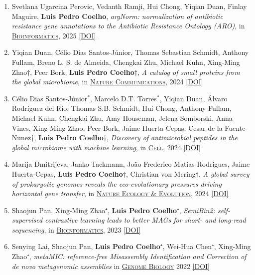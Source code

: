 \documentclass{article}
\newcommand\showdoi[1]{%
    \href{http://dx.doi.org/#1}{[DOI]}%
}
\newcommand\pubname[1]{\textsc{\uline{#1}}}
\newcommand\costar{${}^{*}$}
\newcommand\cosenior{†}
\begin{document}
\begin{enumerate}[resume]

\item Svetlana Ugarcina Perovic, Vedanth Ramji, Hui Chong, Yiqian Duan, Finlay Maguire, \textbf{Luis Pedro Coelho}, \emph{argNorm: normalization of antibiotic resistance gene annotations to the Antibiotic Resistance Ontology (ARO)}, in \pubname{Bioinformatics}, 2025 \showdoi{10.1093/bioinformatics/btaf173}

\item Yiqian Duan, Célio Dias Santos-Júnior, Thomas Sebastian Schmidt, Anthony Fullam, Breno L. S. de Almeida, Chengkai Zhu, Michael Kuhn, Xing-Ming Zhao\cosenior, Peer Bork, \textbf{Luis Pedro Coelho}\cosenior, \emph{A catalog of small proteins from the global microbiome}, in \pubname{Nature Communications}, 2024 \showdoi{10.1038/s41467-024-51894-6}

\item Célio Dias Santos-Júnior\costar, Marcelo D.T. Torres\costar, Yiqian Duan, Álvaro Rodríguez del Río, Thomas S.B. Schmidt, Hui Chong, Anthony Fullam, Michael Kuhn, Chengkai Zhu, Amy Houseman, Jelena Somborski, Anna Vines, Xing-Ming Zhao, Peer Bork, Jaime Huerta-Cepas, Cesar de la Fuente-Nunez\cosenior, \textbf{Luis Pedro Coelho}\cosenior, \emph{Discovery of antimicrobial peptides in the global microbiome with machine learning}, in \pubname{Cell}, 2024 \showdoi{10.1016/j.cell.2024.05.013}

\item Marija Dmitrijeva, Janko Tackmann, João Frederico Matias Rodrigues, Jaime Huerta-Cepas, \textbf{Luis Pedro Coelho}\cosenior, Christian von Mering\cosenior, \emph{A global survey of prokaryotic genomes reveals the eco-evolutionary pressures driving horizontal gene transfer}, in \pubname{Nature Ecology \& Evolution}, 2024 \showdoi{10.1038/s41559-024-02357-0}

\item Shaojun Pan, Xing-Ming Zhao⁺, \textbf{Luis Pedro Coelho}⁺, \emph{SemiBin2: self-supervised contrastive learning leads to better MAGs for short- and long-read sequencing}, in \pubname{Bioinformatics}, 2023 \showdoi{10.1093/bioinformatics/btad209}

\item Senying Lai, Shaojun Pan, \textbf{Luis Pedro Coelho}⁺, Wei-Hua Chen⁺,
Xing-Ming Zhao⁺, \emph{metaMIC: reference-free Misassembly Identification and
Correction of de novo metagenomic assemblies} in \pubname{Genome Biology} 2022
\showdoi{10.1186/s13059-022-02810-y}



\end{enumerate}
\end{document}
